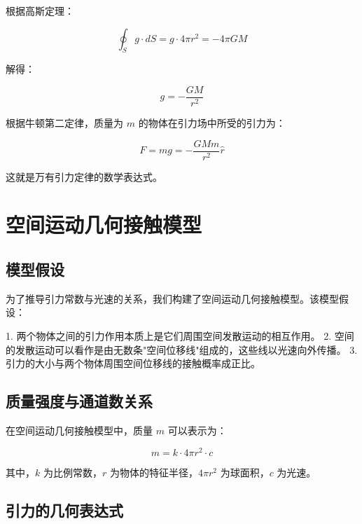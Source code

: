 \documentclass[12pt,a4paper]{article}
\begin{document}
根据高斯定理：

\begin{equation}
\oint_S g \cdot dS = g \cdot 4\pi r^2 = -4\pi G M

\end{equation}

解得：

\begin{equation}
g = -\frac{G M}{r^2}

\end{equation}

根据牛顿第二定律，质量为 $m$ 的物体在引力场中所受的引力为：

\begin{equation}
F = m g = -\frac{G M m}{r^2} \hat{r}

\end{equation}

这就是万有引力定律的数学表达式。

\section{空间运动几何接触模型}
\label{section:space_motion_contact_model}

\subsection{模型假设}
\label{subsection:model_assumptions}

为了推导引力常数与光速的关系，我们构建了空间运动几何接触模型。该模型假设：

1. 两个物体之间的引力作用本质上是它们周围空间发散运动的相互作用。
2. 空间的发散运动可以看作是由无数条"空间位移线"组成的，这些线以光速向外传播。
3. 引力的大小与两个物体周围空间位移线的接触概率成正比。

\subsection{质量强度与通道数关系}
\label{subsection:mass_intensity}

在空间运动几何接触模型中，质量 $m$ 可以表示为：

\begin{equation}
m = k \cdot 4\pi r^2 \cdot c

\end{equation}

其中，$k$ 为比例常数，$r$ 为物体的特征半径，$4\pi r^2$ 为球面积，$c$ 为光速。

\subsection{引力的几何表达式}
\label{subsection:gravitational_geometric_expression}
\end{document}
